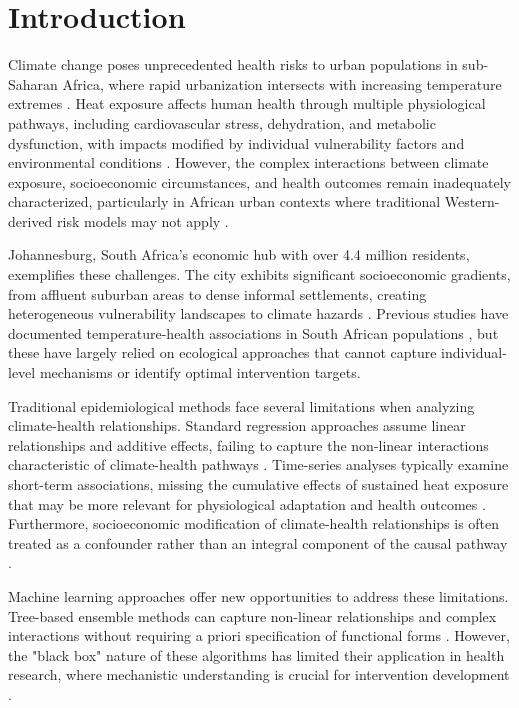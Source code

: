 \documentclass[11pt,a4paper]{article}
\begin{document}
\doublespacing
\linenumbers

\section{Introduction}

Climate change poses unprecedented health risks to urban populations in sub-Saharan Africa, where rapid urbanization intersects with increasing temperature extremes \citep{watts2021lancet,romanello2022lancet}. Heat exposure affects human health through multiple physiological pathways, including cardiovascular stress, dehydration, and metabolic dysfunction, with impacts modified by individual vulnerability factors and environmental conditions \citep{hajek2022heat,li2022heat}. However, the complex interactions between climate exposure, socioeconomic circumstances, and health outcomes remain inadequately characterized, particularly in African urban contexts where traditional Western-derived risk models may not apply \citep{robinson2021african}.

Johannesburg, South Africa's economic hub with over 4.4 million residents, exemplifies these challenges. The city exhibits significant socioeconomic gradients, from affluent suburban areas to dense informal settlements, creating heterogeneous vulnerability landscapes to climate hazards \citep{maas2016johannesburg}. Previous studies have documented temperature-health associations in South African populations \citep{wright2005time,wichmann2009effects}, but these have largely relied on ecological approaches that cannot capture individual-level mechanisms or identify optimal intervention targets.

Traditional epidemiological methods face several limitations when analyzing climate-health relationships. Standard regression approaches assume linear relationships and additive effects, failing to capture the non-linear interactions characteristic of climate-health pathways \citep{gasparrini2015mortality}. Time-series analyses typically examine short-term associations, missing the cumulative effects of sustained heat exposure that may be more relevant for physiological adaptation and health outcomes \citep{armstrong2014models}. Furthermore, socioeconomic modification of climate-health relationships is often treated as a confounder rather than an integral component of the causal pathway \citep{reid2009mapping}.

Machine learning approaches offer new opportunities to address these limitations. Tree-based ensemble methods can capture non-linear relationships and complex interactions without requiring a priori specification of functional forms \citep{chen2016xgboost,breiman2001random}. However, the "black box" nature of these algorithms has limited their application in health research, where mechanistic understanding is crucial for intervention development \citep{murdoch2019definitions}.
\end{document}
